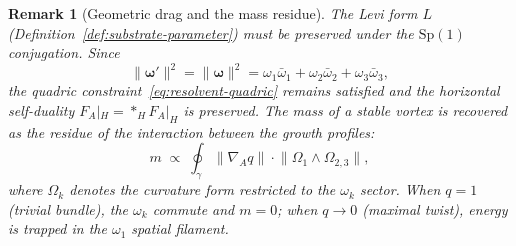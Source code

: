 \documentclass[12pt,a4paper]{report}
\newtheorem{remark}[theorem]{Remark}
\begin{document}
\begin{remark}[Geometric drag and the mass residue]
\label{rem:geometric-drag}
The Levi form $L$ (Definition~\ref{def:substrate-parameter}) must be
preserved under the $\mathrm{Sp}(1)$ conjugation.  Since
\[
  \lVert\boldsymbol{\omega}'\rVert^2
  =\lVert\boldsymbol{\omega}\rVert^2
  =\omega_1\bar{\omega}_1+\omega_2\bar{\omega}_2+\omega_3\bar{\omega}_3,
\]
the quadric constraint~\eqref{eq:resolvent-quadric} remains satisfied and
the horizontal self-duality $F_A|_H={*_H}F_A|_H$ is preserved.  The mass of a stable vortex is
recovered as the residue of the interaction between the growth profiles:
\begin{equation}\label{eq:mass-residue}
  m \;\propto\;
  \oint_{\gamma}
  \lVert\nabla_A q\rVert\cdot
  \lVert\Omega_1\wedge\Omega_{2,3}\rVert,
\end{equation}
where $\Omega_k$ denotes the curvature form restricted to the $\omega_k$
sector.  When $q=1$ (trivial bundle), the $\omega_k$ commute and $m=0$;
when $q\to 0$ (maximal twist), energy is trapped in the $\omega_1$ spatial
filament.
\end{remark}
\end{document}
